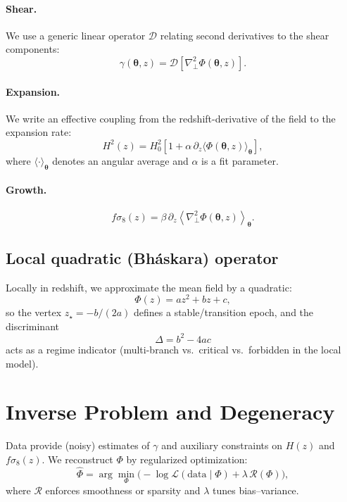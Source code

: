 \documentclass[11pt]{article}
\begin{document}
\paragraph{Shear.}
We use a generic linear operator $\mathcal{D}$ relating second derivatives to the shear components:
\begin{equation}
\gamma(\bm{\theta}, z)=\mathcal{D}\!\left[\nabla_\perp^2\Phi(\bm{\theta}, z)\right].
\end{equation}

\paragraph{Expansion.}
We write an effective coupling from the redshift-derivative of the field to the expansion rate:
\begin{equation}
H^2(z)=H_0^2\left[1+\alpha\,\partial_z \langle \Phi(\bm{\theta}, z)\rangle_{\bm{\theta}}\right],
\end{equation}
where $\langle\cdot\rangle_{\bm{\theta}}$ denotes an angular average and $\alpha$ is a fit parameter.

\paragraph{Growth.}
\begin{equation}
f\sigma_8(z)=\beta\,\partial_z \left\langle\nabla_\perp^2\Phi(\bm{\theta}, z)\right\rangle_{\bm{\theta}}.
\end{equation}

\subsection{Local quadratic (Bh\'askara) operator}
Locally in redshift, we approximate the mean field by a quadratic:
\begin{equation}
\Phi(z)=a z^2 + b z + c,
\end{equation}
so the vertex $z_\star=-b/(2a)$ defines a stable/transition epoch, and the discriminant
\begin{equation}
\Delta=b^2-4ac
\end{equation}
acts as a regime indicator (multi-branch vs.\ critical vs.\ forbidden in the local model).

\section{Inverse Problem and Degeneracy}
Data provide (noisy) estimates of $\gamma$ and auxiliary constraints on $H(z)$ and $f\sigma_8(z)$. We reconstruct $\Phi$ by regularized optimization:
\begin{equation}
\widehat{\Phi}
=\arg\min_{\Phi}\Big(
-\log \mathcal{L}(\text{data}\mid \Phi)
+\lambda\,\mathcal{R}(\Phi)
\Big),
\end{equation}
where $\mathcal{R}$ enforces smoothness or sparsity and $\lambda$ tunes bias--variance.
\end{document}
